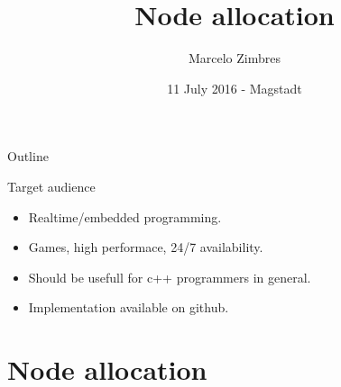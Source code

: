 \documentclass[10pt,aspectratio=169]{beamer}
\title[Node allocation] {Node allocation}
\subtitle
{Marcelo Zimbres}
\institute[Marcelo Zimbres - Software Developer - Physicist]
{
}
\date[11 July 2016 - Magstadt - Germany] {11 July 2016 - Magstadt}
\begin{document}
\begin{frame}
  \titlepage
\end{frame}

\begin{frame}{Outline}
  \tableofcontents[]
\end{frame}



\begin{frame}{Target audience}{}
\begin{itemize}
    \item Realtime/embedded programming.
    \item Games, high performace, 24/7 availability.
    \item Should be usefull for c++ programmers in general.
    \item Implementation available on github.
\end{itemize}
\end{frame}

\part{Node allocation}
\end{document}

